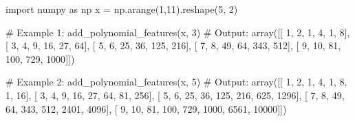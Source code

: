 \documentclass[]{article}
\newenvironment{Shaded}{\begin{snugshade}}{\end{snugshade}}
\newcommand{\CommentTok}[1]{\textcolor[rgb]{0.48,0.49,0.49}{#1}}
\newcommand{\DecValTok}[1]{\textcolor[rgb]{0.96,0.45,0.00}{#1}}
\newcommand{\ImportTok}[1]{\textcolor[rgb]{0.15,0.68,0.38}{#1}}
\newcommand{\NormalTok}[1]{\textcolor[rgb]{0.81,0.81,0.76}{#1}}
\newcommand{\OperatorTok}[1]{\textcolor[rgb]{0.81,0.81,0.76}{#1}}
\begin{document}
\begin{Shaded}
\begin{Highlighting}[]
\ImportTok{import}\NormalTok{ numpy }\ImportTok{as}\NormalTok{ np}
\NormalTok{x }\OperatorTok{=}\NormalTok{ np.arange(}\DecValTok{1}\NormalTok{,}\DecValTok{11}\NormalTok{).reshape(}\DecValTok{5}\NormalTok{, }\DecValTok{2}\NormalTok{)}

\CommentTok{# Example 1:}
\NormalTok{add_polynomial_features(x, }\DecValTok{3}\NormalTok{)}
\CommentTok{# Output:}
\NormalTok{array([[   }\DecValTok{1}\NormalTok{,    }\DecValTok{2}\NormalTok{,    }\DecValTok{1}\NormalTok{,    }\DecValTok{4}\NormalTok{,    }\DecValTok{1}\NormalTok{,    }\DecValTok{8}\NormalTok{],}
\NormalTok{       [   }\DecValTok{3}\NormalTok{,    }\DecValTok{4}\NormalTok{,    }\DecValTok{9}\NormalTok{,   }\DecValTok{16}\NormalTok{,   }\DecValTok{27}\NormalTok{,   }\DecValTok{64}\NormalTok{],}
\NormalTok{       [   }\DecValTok{5}\NormalTok{,    }\DecValTok{6}\NormalTok{,   }\DecValTok{25}\NormalTok{,   }\DecValTok{36}\NormalTok{,  }\DecValTok{125}\NormalTok{,  }\DecValTok{216}\NormalTok{],}
\NormalTok{       [   }\DecValTok{7}\NormalTok{,    }\DecValTok{8}\NormalTok{,   }\DecValTok{49}\NormalTok{,   }\DecValTok{64}\NormalTok{,  }\DecValTok{343}\NormalTok{,  }\DecValTok{512}\NormalTok{],}
\NormalTok{       [   }\DecValTok{9}\NormalTok{,   }\DecValTok{10}\NormalTok{,   }\DecValTok{81}\NormalTok{,  }\DecValTok{100}\NormalTok{,  }\DecValTok{729}\NormalTok{, }\DecValTok{1000}\NormalTok{]])}

\CommentTok{# Example 2:}
\NormalTok{add_polynomial_features(x, }\DecValTok{5}\NormalTok{)}
\CommentTok{# Output:}
\NormalTok{array([[    }\DecValTok{1}\NormalTok{,     }\DecValTok{2}\NormalTok{,     }\DecValTok{1}\NormalTok{,     }\DecValTok{4}\NormalTok{,     }\DecValTok{1}\NormalTok{,     }\DecValTok{8}\NormalTok{,     }\DecValTok{1}\NormalTok{,    }\DecValTok{16}\NormalTok{],}
\NormalTok{       [    }\DecValTok{3}\NormalTok{,     }\DecValTok{4}\NormalTok{,     }\DecValTok{9}\NormalTok{,    }\DecValTok{16}\NormalTok{,    }\DecValTok{27}\NormalTok{,    }\DecValTok{64}\NormalTok{,    }\DecValTok{81}\NormalTok{,   }\DecValTok{256}\NormalTok{],}
\NormalTok{       [    }\DecValTok{5}\NormalTok{,     }\DecValTok{6}\NormalTok{,    }\DecValTok{25}\NormalTok{,    }\DecValTok{36}\NormalTok{,   }\DecValTok{125}\NormalTok{,   }\DecValTok{216}\NormalTok{,   }\DecValTok{625}\NormalTok{,  }\DecValTok{1296}\NormalTok{],}
\NormalTok{       [    }\DecValTok{7}\NormalTok{,     }\DecValTok{8}\NormalTok{,    }\DecValTok{49}\NormalTok{,    }\DecValTok{64}\NormalTok{,   }\DecValTok{343}\NormalTok{,   }\DecValTok{512}\NormalTok{,  }\DecValTok{2401}\NormalTok{,  }\DecValTok{4096}\NormalTok{],}
\NormalTok{       [    }\DecValTok{9}\NormalTok{,    }\DecValTok{10}\NormalTok{,    }\DecValTok{81}\NormalTok{,   }\DecValTok{100}\NormalTok{,   }\DecValTok{729}\NormalTok{,  }\DecValTok{1000}\NormalTok{,  }\DecValTok{6561}\NormalTok{, }\DecValTok{10000}\NormalTok{]])}
\end{Highlighting}
\end{Shaded}
\end{document}
